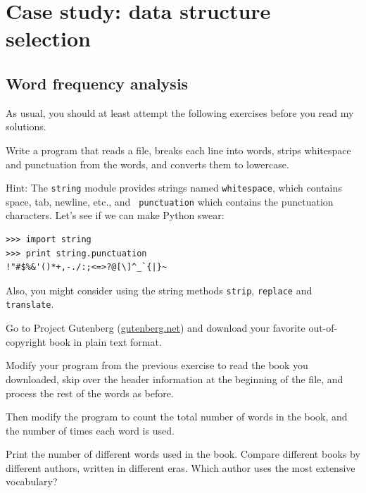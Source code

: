 \documentclass[10pt]{book}
\begin{document}




\chapter{Case study: data structure selection}

\section{Word frequency analysis}
\label{analysis}

As usual, you should at least attempt the following exercises
before you read my solutions.

\begin{ex}
Write a program that reads a file, breaks each line into
words, strips whitespace and punctuation from the words, and
converts them to lowercase.


Hint: The {\tt string} module provides strings named {\tt whitespace},
which contains space, tab, newline, etc., and {\tt
  punctuation} which contains the punctuation characters.  Let's see
if we can make Python swear:

\beforeverb
\begin{verbatim}
>>> import string
>>> print string.punctuation
!"#$%&'()*+,-./:;<=>?@[\]^_`{|}~
\end{verbatim}
\afterverb
%
Also, you might consider using the string methods {\tt strip},
{\tt replace} and {\tt translate}.


\end{ex}


\begin{ex}


Go to Project Gutenberg (\url{gutenberg.net}) and download 
your favorite out-of-copyright book in plain text format.


Modify your program from the previous exercise to read the book
you downloaded, skip over the header information at the beginning
of the file, and process the rest of the words as before.

Then modify the program to count the total number of words in
the book, and the number of times each word is used.


Print the number of different words used in the book.  Compare
different books by different authors, written in different eras.
Which author uses the most extensive vocabulary?
\end{ex}
\end{document}
